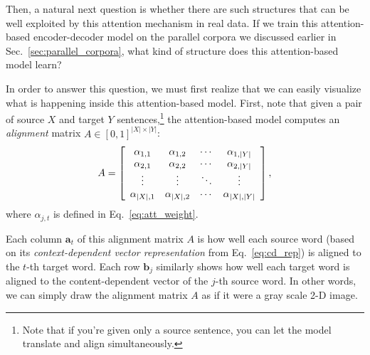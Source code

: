 \documentclass{report}
\newcommand{\vect}[1]{\mathbf{#1}}
\newcommand{\va}[0]{\vect{a}}
\newcommand{\vb}[0]{\vect{b}}
\begin{document}
Then, a natural next question is whether there are such structures that can be
well exploited by this attention mechanism in real data. If we train this
attention-based encoder-decoder model on the parallel corpora we discussed
earlier in Sec.~\ref{sec:parallel_corpora}, what kind of structure does this
attention-based model learn?

In order to answer this question, we must first realize that we can easily
visualize what is happening inside this attention-based model. First, note that
given a pair of source $X$ and target $Y$ sentences,\footnote{
    Note that if you're given only a source sentence, you can let the model
    translate and align simultaneously.
}
the attention-based model
computes an {\em alignment} matrix $A \in \left[ 0, 1\right]^{|X| \times |Y|}$:
\begin{align*}
    A = \left[ 
        \begin{array}{c c c c}
            \alpha_{1,1} & \alpha_{1,2} & \cdots & \alpha_{1, |Y|} \\
            \alpha_{2,1} & \alpha_{2,2} & \cdots & \alpha_{2, |Y|} \\
            \vdots & \vdots & \ddots & \vdots \\
            \alpha_{|X|,1} & \alpha_{|X|, 2} & \cdots & \alpha_{|X|, |Y|} 
        \end{array}
    \right],
\end{align*}
where $\alpha_{j,t}$ is defined in Eq.~\eqref{eq:att_weight}.

Each column $\va_t$ of this alignment matrix $A$ is how well each source word
(based on its {\em context-dependent vector representation} from
Eq.~\eqref{eq:cd_rep}) is aligned to the $t$-th target word. Each row $\vb_{j}$
similarly shows how well each target word is aligned to the content-dependent
vector of the $j$-th source word. In other words, we can simply draw the
alignment matrix $A$ as if it were a gray scale 2-D image. 
\end{document}

